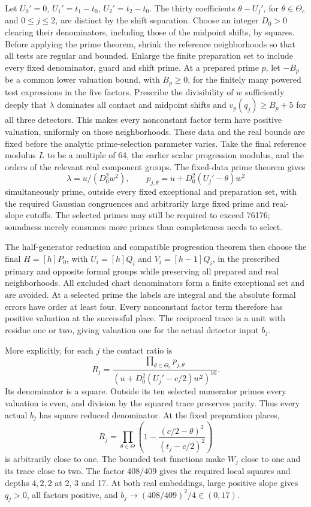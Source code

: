\documentclass[11pt,a4paper]{article}
\begin{document}
Let $U_0'=0$, $U_1'=t_1-t_0$, $U_2'=t_2-t_0$.
The thirty coefficients $\theta-U_j'$, for
$\theta\in\Theta_c$ and $0\le j\le2$, are distinct by the
shift separation. Choose an integer $D_0>0$ clearing their
denominators, including those of the midpoint shifts, by squares.
Before applying the prime theorem, shrink the reference neighborhoods
so that all tests are regular and bounded. Enlarge the finite
preparation set to include every fixed denominator, guard and shift
prime. At a prepared prime $p$, let $-B_p$ be a common lower
valuation bound, with $B_p\ge0$, for the finitely many powered test expressions in
the five factors. Prescribe the divisibility of $w$ sufficiently
deeply that $\lambda$ dominates all contact and midpoint shifts
and $v_p(q_j)\ge B_p+5$ for all three detectors. This makes every
nonconstant factor term have positive valuation, uniformly on those
neighborhoods. These data and the real bounds are fixed before the
analytic prime-selection parameter varies. Take the final reference
modulus $L$ to be a multiple of 64, the earlier scalar progression
modulus, and the orders of the relevant real component groups.
The fixed-data prime theorem gives
\[
 \lambda=u/(D_0^2w^2),\qquad
 p_{j,\theta}=u+D_0^2(U_j'-\theta)w^2
\]
simultaneously prime, outside every fixed exceptional and preparation
set, with the required Gaussian congruences and arbitrarily large
fixed prime and real-slope cutoffs. The selected primes may still be required to exceed 76176; soundness merely consumes
more primes than completeness needs to select.

The half-generator reduction and compatible progression theorem
then choose the final $H=[h]P_0$, with
$U_i=[h]Q_i$ and $V_i=[h-1]Q_i$, in the prescribed primary and
opposite formal groups while preserving all prepared and real
neighborhoods. All excluded chart denominators form a finite
exceptional set and are avoided. At a selected prime the labels
are integral and the absolute formal errors have order at least
four. Every nonconstant factor term therefore has positive
valuation at the successful place. The reciprocal trace is a
unit with residue one or two, giving valuation one for the actual
detector input $b_j$.

More explicitly, for each $j$ the contact ratio is
\[
 R_j=\frac{\prod_{\theta\in\Theta_c}p_{j,\theta}}
              {(u+D_0^2(U_j'-c/2)w^2)^{10}}.
\]
Its denominator is a square. Outside its ten selected numerator
primes every valuation is even, and division by the squared trace
preserves parity. Thus every actual $b_j$ has square reduced
denominator. At the fixed preparation places,
\[
 R_j=\prod_{\theta\in\Theta}
 \left(1-\frac{(c/2-\theta)^2}{(t_j-c/2)^2}\right)
\]
is arbitrarily close to one. The bounded test functions make
$W_j$ close to one and its trace close to two. The factor $408/409$
gives the required local squares and depths $4,2,2$ at 2, 3 and 17.
At both real embeddings, large positive slope gives $q_j>0$,
all factors positive, and
$b_j\longrightarrow(408/409)^2/4\in(0,17)$.
\end{document}
